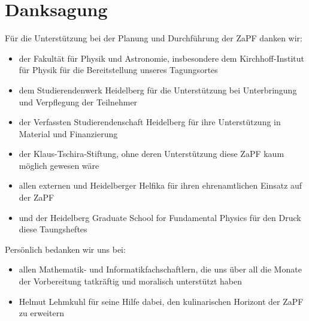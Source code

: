 
\section{Danksagung}
Für die Unterstützung bei der Planung und Durchführung der ZaPF danken wir:
\begin{itemize}
\item der Fakultät für Physik und Astronomie, insbesondere dem Kirchhoff-Institut für Physik für die Bereitstellung unseres Tagungsortes
\item dem Studierendenwerk Heidelberg für die Unterstützung bei Unterbringung und Verpflegung der Teilnehmer
\item der Verfassten Studierendenschaft Heidelberg für ihre Unterstützung in Material und Finanzierung
\item der Klaus-Tschira-Stiftung, ohne deren Unterstützung diese ZaPF kaum möglich gewesen wäre
\item allen externen und Heidelberger Helfika für ihren ehrenamtlichen Einsatz auf der ZaPF
\item und der Heidelberg Graduate School for Fundamental Physics für den Druck diese Taungsheftes
\end{itemize}
 Persönlich bedanken wir uns bei:
 \begin{itemize}
 \item allen Mathematik- und Informatikfachschaftlern, die uns über all die Monate der Vorbereitung tatkräftig und moralisch unterstützt haben
 \item Helmut Lehmkuhl für seine Hilfe dabei, den kulinarischen Horizont der ZaPF zu erweitern
 \end{itemize}
 


